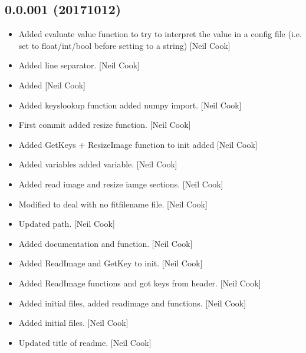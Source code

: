 \documentclass[a4paper,10pt,english]{report}
\begin{document}
\subsection{0.0.001 (2017\sphinxhyphen{}10\sphinxhyphen{}12)}
\label{\detokenize{misc/changelog:id569}}\begin{itemize}
\item {} 
Added evaluate value function to try to interpret the value in a
config file (i.e. set to float/int/bool before setting to a string)
{[}Neil Cook{]}

\item {} 
Added line separator. {[}Neil Cook{]}

\item {} 
Added  {[}Neil Cook{]}

\item {} 
Added keyslookup function added numpy import. {[}Neil Cook{]}

\item {} 
First commit added resize function. {[}Neil Cook{]}

\item {} 
Added GetKeys + ResizeImage function to init added  {[}Neil
Cook{]}

\item {} 
Added  variables added 
variable. {[}Neil Cook{]}

\item {} 
Added read image and resize iamge sections. {[}Neil Cook{]}

\item {} 
Modified  to deal with no fitfilename file. {[}Neil Cook{]}

\item {} 
Updated  path. {[}Neil Cook{]}

\item {} 
Added  documentation and
 function. {[}Neil Cook{]}

\item {} 
Added ReadImage and GetKey to init. {[}Neil Cook{]}

\item {} 
Added ReadImage functions and got keys from header. {[}Neil Cook{]}

\item {} 
Added initial files, added readimage and  functions.
{[}Neil Cook{]}

\item {} 
Added initial files. {[}Neil Cook{]}

\item {} 
Updated title of readme. {[}Neil Cook{]}

\end{itemize}



\renewcommand{\indexname}{Index}
\printindex
\end{document}
